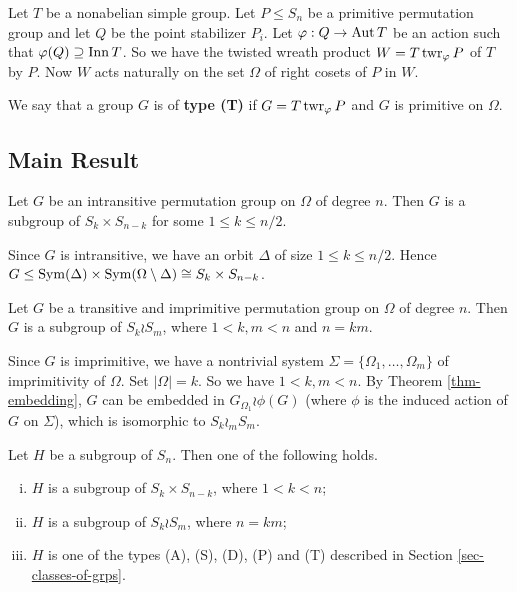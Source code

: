 Let $T$ be a nonabelian simple group. Let $P\leq S_n$ be a primitive permutation group and let $Q$ be the point stabilizer $P_i$. Let $\varphi:Q\rightarrow \operatorname{Aut} T$ be an action such that $\varphi(Q)\supseteq \operatorname{Inn} T$. So we have the twisted wreath product $W=T\operatorname{twr}_\varphi P$ of $T$ by $P$. Now $W$ acts naturally on the set $\Omega$ of right cosets of $P$ in $W$.


 We say that a group $G$ is of \textbf{type (T)} if $G = T\operatorname{twr}_\varphi P$ and $G$ is primitive on $\Omega$. 


\subsection{Main Result}

\begin{proposition}
	Let $G$ be an intransitive permutation group on $\Omega$ of degree $n$. Then $G$ is  a subgroup of $S_k\times S_{n-k}$ for some $1\leq k\leq n/2$.
\end{proposition}
\begin{sketch}
	Since $G$ is intransitive, we have an orbit $\Delta$ of size $1\leq k\leq n/2$. Hence $G \leq \operatorname{Sym}(\Delta) \times \operatorname{Sym}(\Omega\setminus \Delta) \cong S_k \times S_{n-k}$.
\end{sketch}



\begin{proposition}
	Let $G$ be a transitive and imprimitive permutation group on $\Omega$ of degree $n$. Then $G$ is a subgroup of $S_k \wr S_m$, where $1<k,m<n$ and $n = km$.
\end{proposition}
\begin{sketch}
	Since $G$ is imprimitive, we have a nontrivial system $\Sigma =\{\Omega_1,\dots, \Omega_m\}$ of imprimitivity of $\Omega$. Set $|\Omega| = k$. So we have $1<k,m<n$. By Theorem \ref{thm-embedding}, $G$ can be embedded in $G_{\Omega_1}\wr\phi(G)$ (where $\phi$ is the induced action of $G$ on $\Sigma$), which is isomorphic to $S_k \wr_m S_m$.
\end{sketch}



\begin{theorem}
	 Let $H$ be a subgroup of $S_n$. Then one of the following holds.
	\begin{enumerate}[(i)]
		\item $H$ is a subgroup of $S_k \times S_{n-k}$, where $1<k<n$;
		\item $H$ is a subgroup of $S_k \wr S_m$, where $n = km$;
		\item $H$ is one of the types (A), (S), (D), (P) and (T) described in Section \ref{sec-classes-of-grps}.
	\end{enumerate}
\end{theorem}


